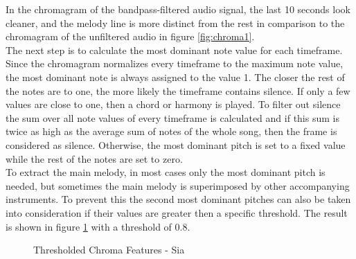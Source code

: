 \noindent In the chromagram of the bandpass-filtered audio signal, the last 10 seconds look cleaner, and the melody line is more distinct from the rest in comparison to the chromagram of the unfiltered audio in figure \ref{fig:chroma1}.\\
The next step is to calculate the most dominant note value for each timeframe. Since the chromagram normalizes every timeframe to the maximum note value, the most dominant note is always assigned to the value 1. The closer the rest of the notes are to one, the more likely the timeframe contains silence. If only a few values are close to one, then a chord or harmony is played. To filter out silence the sum over all note values of every timeframe is calculated and if this sum is twice as high as the average sum of notes of the whole song, then the frame is considered as silence. Otherwise, the most dominant pitch is set to a fixed value while the rest of the notes are set to zero.\\
\noindent To extract the main melody, in most cases only the most dominant pitch is needed, but sometimes the main melody is superimposed by other accompanying instruments. To prevent this the second most dominant pitches can also be taken into consideration if their values are greater then a specific threshold. The result is shown in figure \ref{fig:chromavg} with a threshold of 0.8.
\begin{figure}[htbp]
	\centering
	\caption{Thresholded Chroma Features - Sia}
	\label{fig:chromavg}
\end{figure}

